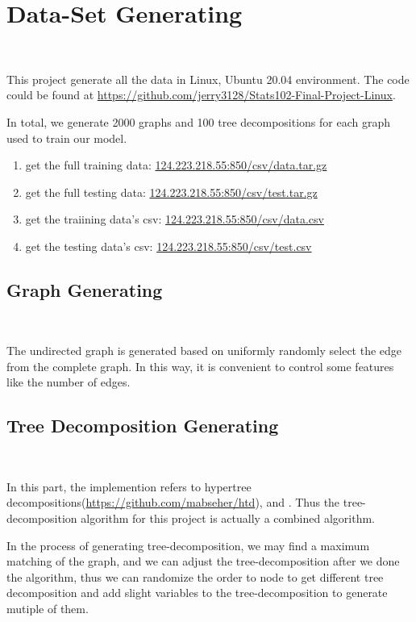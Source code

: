 \section{Data-Set Generating}~\label{sec.DataGen}

This project generate all the data in Linux, Ubuntu 20.04 environment. The code could be found at \url{https://github.com/jerry3128/Stats102-Final-Project-Linux}.

In total, we generate 2000 graphs and 100 tree decompositions for each graph used to train our model.

\begin{enumerate}
    \item get the full training data: \url{124.223.218.55:850/csv/data.tar.gz}
    \item get the full testing data: \url{124.223.218.55:850/csv/test.tar.gz}
    \item get the traiining data's csv: \url{124.223.218.55:850/csv/data.csv}
    \item get the testing data's csv: \url{124.223.218.55:850/csv/test.csv}
\end{enumerate}

\subsection{Graph Generating}~\label{sec.DataGen1}

The undirected graph is generated based on uniformly randomly select the edge from the complete graph. In this way, it is convenient to control some features like the number of edges.

\subsection{Tree Decomposition Generating}~\label{sec.DataGen2}

In this part, the implemention refers to hypertree decompositions(\url{https://github.com/mabseher/htd}), and \cite{BHL1996LinearTreeDeomposition}. Thus the tree-decomposition algorithm for this project is actually a combined algorithm.

In the process of generating tree-decomposition, we may find a maximum matching of the graph, and we can adjust the tree-decomposition after we done the algorithm, thus we can randomize the order to node to get different tree decomposition and add slight variables to the tree-decomposition to generate mutiple of them.

